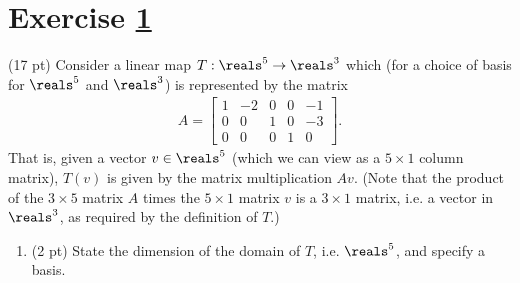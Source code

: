 %
%
%
%


\section{Exercise \ref{sec : Math211 Summer2019 Exam2 Q5}}
\label{sec : Math211 Summer2019 Exam2 Q5}

(17 pt) Consider a linear map $T : \reals^{5} \rightarrow \reals^{3}$ which (for a choice of basis for $\reals^{5}$ and $\reals^{3}$) is represented by the matrix
\begin{align*}
A
=
\begin{bmatrix}
1	&	-2	&	0	&	0	&	-1	\\
0	&	0	&	1	&	0	&	-3	\\
0	&	0	&	0	&	1	&	0
\end{bmatrix}%
.
\end{align*}
That is, given a vector $v \in \reals^{5}$ (which we can view as a $5 \times 1$ column matrix), $T(v)$ is given by the matrix multiplication $A v$. (Note that the product of the $3 \times 5$ matrix $A$ times the $5 \times 1$ matrix $v$ is a $3 \times 1$ matrix, i.e. a vector in $\reals^{3}$, as required by the definition of $T$.)
\begin{enumerate}[label=(\alph*)]
\item\label{itm : E2Q5a} (2 pt) State the dimension of the domain of $T$, i.e. $\reals^{5}$, and specify a basis.
\end{enumerate}

